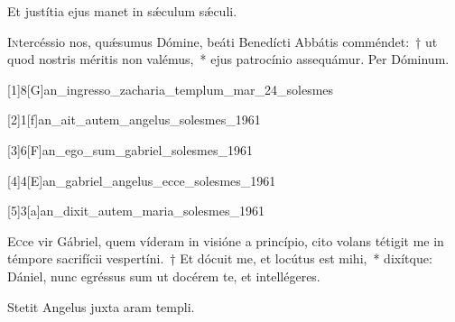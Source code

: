 \documentclass[vesperale_romanum.tex]{subfiles}
\begin{document}
\rr Et justítia ejus manet in sǽculum sǽculi.


\commferiae

\myrule

\newpage



\duplexmajus

\oratio

\lettrine{I}{n}tercéssio nos, quǽsumus Dómine, beáti Benedícti Abbátis comméndet:~† ut quod nostris méritis non valémus,~* ejus patrocínio assequámur. Per Dóminum.

\commferiae

\myrule


\duplexmajus


[1]{8}[G]{an_ingresso_zacharia_templum_mar_24_solesmes}

[2]{1}[f]{an_ait_autem_angelus_solesmes_1961}
 
 [3]{6}[F]{an_ego_sum_gabriel_solesmes_1961}
 
 [4]{4}[E]{an_gabriel_angelus_ecce_solesmes_1961}

[5]{3}[a]{an_dixit_autem_maria_solesmes_1961}


\lettrine{E}{c}ce vir Gábriel, quem víderam in visióne a princípio, cito volans tétigit me in témpore sacrifícii vespertíni.~† Et dócuit me, et locútus est mihi,~* dixítque: Dániel, nunc egréssus sum ut docérem te, et intellégeres.

\hymnus


\vv Stetit Angelus juxta aram templi.
\end{document}
